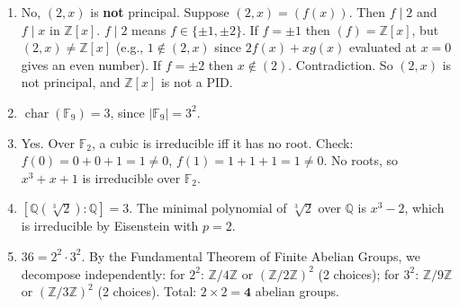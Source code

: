 \documentclass[11pt]{article}
\begin{document}
\begin{enumerate}
\item No, $(2,x)$ is \textbf{not} principal. Suppose $(2,x)=(f(x))$. Then $f\mid 2$ and $f\mid x$ in $\mathbb{Z}[x]$. $f\mid 2$ means $f\in\{\pm 1,\pm 2\}$. If $f=\pm 1$ then $(f)=\mathbb{Z}[x]$, but $(2,x)\neq\mathbb{Z}[x]$ (e.g., $1\notin(2,x)$ since $2f(x)+xg(x)$ evaluated at $x=0$ gives an even number). If $f=\pm 2$ then $x\notin(2)$. Contradiction. So $(2,x)$ is not principal, and $\mathbb{Z}[x]$ is not a PID.

\item $\operatorname{char}(\mathbb{F}_9)=3$, since $|\mathbb{F}_9|=3^2$.

\item Yes. Over $\mathbb{F}_2$, a cubic is irreducible iff it has no root. Check: $f(0)=0+0+1=1\neq 0$, $f(1)=1+1+1=1\neq 0$. No roots, so $x^3+x+1$ is irreducible over $\mathbb{F}_2$.

\item $[\mathbb{Q}(\sqrt[3]{2}):\mathbb{Q}]=3$. The minimal polynomial of $\sqrt[3]{2}$ over $\mathbb{Q}$ is $x^3-2$, which is irreducible by Eisenstein with $p=2$.

\item $36 = 2^2\cdot 3^2$. By the Fundamental Theorem of Finite Abelian Groups, we decompose independently: for $2^2$: $\mathbb{Z}/4\mathbb{Z}$ or $(\mathbb{Z}/2\mathbb{Z})^2$ (2 choices); for $3^2$: $\mathbb{Z}/9\mathbb{Z}$ or $(\mathbb{Z}/3\mathbb{Z})^2$ (2 choices). Total: $2\times 2=\mathbf{4}$ abelian groups.

\end{enumerate}
\end{document}
